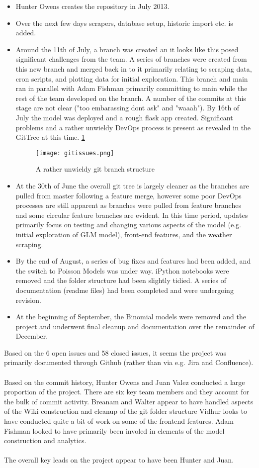 \documentclass{scrreprt}
\begin{document}
\begin{itemize}
	\item Hunter Owens creates the repository in July 2013.
	\item Over the next few days scrapers, database setup, historic import etc. is added.
	\item Around the 11th of July, a branch was created an it looks like this posed significant challenges from the team. A series of branches were created from this new branch and merged back in to it primarily relating to scraping data, cron scripts, and plotting data for initial exploration. This branch and main ran in parallel with Adam Fishman primarily committing to main while the rest of the team developed on the branch. A number of the commits at this stage are not clear ("too embarassing dont ask" and "waaah"). By 16th of July the model was deployed and a rough flask app created. Significant problems and a rather unwieldy DevOps process is present as revealed in the GitTree at this time. \ref{fig:GitIssue}
	 \begin{figure}[h!]
		\centering
		\texttt{[image: gitissues.png]}
		\caption{A rather unwieldy git branch structure}
		\label{fig:GitIssue}
	\end{figure}
	\item At the 30th of June the overall git tree is largely cleaner as the branches are pulled from master following a feature merge, however some poor DevOps processes are still apparent as branches were pulled from feature branches and some circular feature branches are evident. In this time period, updates primarily focus on testing and changing various aspects of the model (e.g. initial exploration of GLM model), front-end features, and the weather scraping.
	\item By the end of August, a series of bug fixes and features had been added, and the switch to Poisson Models was under way. iPython notebooks were removed and the folder structure had been slightly tidied. A series of documentation (readme files) had been completed and were undergoing revision.
	\item At the beginning of September, the Binomial models were removed and the project and underwent final cleanup and documentation over the remainder of December.
\end{itemize}

Based on the 6 open issues and 58 closed issues, it seems the project was primarily documented through Github (rather than via e.g. Jira and Confluence).\\
\\
Based on the commit history, Hunter Owens and Juan Valez conducted a large proportion of the project. There are six key team members and they account for the bulk of commit activity. Breanam and Walter appear to have handled aspects of the Wiki construction and cleanup of the git folder structure Vidhur looks to have conducted quite a bit of work on some of the frontend features. Adam Fishman looked to have primarily been involed in elements of the model construction and analytics.\\
\\
The overall key leads on the project appear to have been Hunter and Juan.
\end{document}
